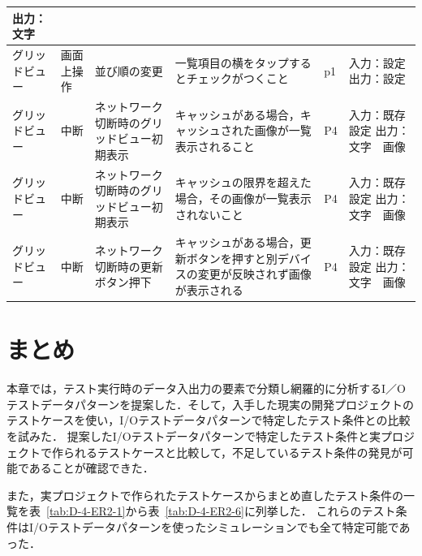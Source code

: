 \begin{table}[htbp]
\begin{tabular}{|p{8em}|p{7em}|p{9em}|p{9em}|p{3em}|p{12em}|}
出力：文字 \bigstrut\\
    \hline
    \multicolumn{1}{|l|}{グリッドビュー} & 画面上操作 & 並び順の変更 & 一覧項目の横をタップするとチェックがつくこと & p1    & 入力：設定
出力：設定 \bigstrut\\
    \hline
    グリッドビュー & 中断    & ネットワーク切断時のグリッドビュー初期表示 & キャッシュがある場合，キャッシュされた画像が一覧表示されること & P4    & 入力：既存設定
出力：文字　画像 \bigstrut\\
    \hline
    グリッドビュー & 中断    & ネットワーク切断時のグリッドビュー初期表示 & キャッシュの限界を超えた場合，その画像が一覧表示されないこと & P4    & 入力：既存設定
出力：文字　画像 \bigstrut\\
    \hline
    グリッドビュー & 中断    & ネットワーク切断時の更新ボタン押下 & キャッシュがある場合，更新ボタンを押すと別デバイスの変更が反映されず画像が表示される & P4    & 入力：既存設定
出力：文字　画像 \bigstrut\\
    \hline
    \end{tabular}%
    \label{tab:D-4-ER-4}%
  \end{table}%

  \newpage
  \section{まとめ}
  本章では，テスト実行時のデータ入出力の要素で分類し網羅的に分析するI／Oテストデータパターンを提案した．そして，入手した現実の開発プロジェクトのテストケースを使い，I/Oテストデータパターンで特定したテスト条件との比較を試みた．
  提案したI/Oテストデータパターンで特定したテスト条件と実プロジェクトで作られるテストケースと比較して，不足しているテスト条件の発見が可能であることが確認できた．

  また，実プロジェクトで作られたテストケースからまとめ直したテスト条件の一覧を表~\ref{tab:D-4-ER2-1}から表~\ref{tab:D-4-ER2-6}に列挙した．
  これらのテスト条件はI/Oテストデータパターンを使ったシミュレーションでも全て特定可能であった．


